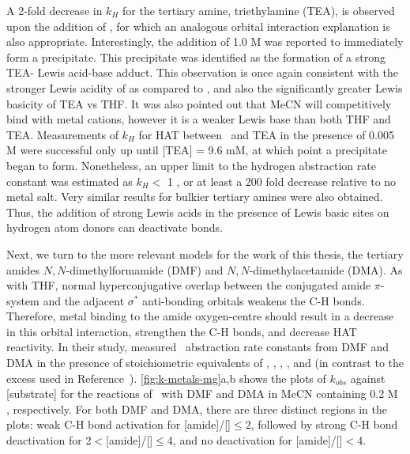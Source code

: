 A 2-fold decrease in $k_H$ for the tertiary amine, triethylamine (TEA), is
observed upon the addition of , for which an analogous orbital
interaction explanation is also appropriate. Interestingly, the addition of 1.0
M  was reported to immediately form a precipitate. This
precipitate was identified as the formation of a strong TEA- Lewis
acid-base adduct. This observation is once again consistent with the stronger
Lewis acidity of  as compared to , and also the
significantly greater Lewis basicity of TEA vs THF.\cite{Salamone2013a,
Reichardt2010} It was also pointed out that MeCN will competitively bind with
metal cations, however it is a weaker Lewis base than both THF and TEA.
Measurements of $k_H$ for HAT between \cumo\ and TEA in the presence of 0.005 M
 were successful only up until [TEA] = 9.6 mM, at which point a
precipitate began to form. Nonetheless, an upper limit to the hydrogen
abstraction rate constant was estimated as $k_H <$ 1 \Ms, or at least a 200
fold decrease relative to no metal salt. Very similar results for bulkier
tertiary amines were also obtained. Thus, the addition of strong Lewis acids in
the presence of Lewis basic sites on hydrogen atom donors can deactivate
 bonds.

Next, we turn to the more relevant models for the work of this thesis, the
tertiary amides $N,N$-dimethylformamide (DMF) and $N,N$-dimethylacetamide (DMA).
As with THF, normal hyperconjugative overlap between the conjugated amide
$\pi$-system and the adjacent  $\sigma^*$ anti-bonding orbitals weakens
the C-H bonds. Therefore, metal binding to the amide oxygen-centre should result
in a decrease in this orbital interaction, strengthen the C-H bonds, and
decrease HAT reactivity. In their study, \citet{Salamone2015metals} measured
\cumo\ abstraction rate constants from DMF and DMA in the presence of
stoichiometric equivalents of , , ,
, and  (in contrast to the excess used in
Reference~). \ref{fig:k-metals-mg}a,b shows the plots of
$k_{obs}$ against [substrate] for the reactions of \cumo\ with DMF and DMA in
MeCN containing 0.2 M , respectively. For both DMF and DMA, there
are three distinct regions in the plots: weak C-H bond activation for
[amide]/[]$\leq 2$, followed by strong C-H bond deactivation for
2$<$[amide]/[]$\leq$4, and no deactivation for
[amide]/[]$<$4.

